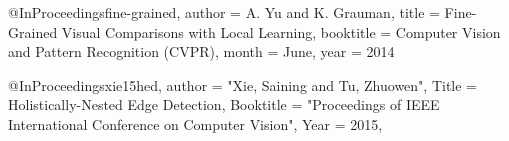 @InProceedings{fine-grained,
  author = {A. Yu and K. Grauman},
  title = {{F}ine-{G}rained {V}isual {C}omparisons with {L}ocal {L}earning},
  booktitle = {Computer Vision and Pattern Recognition (CVPR)},
  month = {June},
  year = {2014}
}

@InProceedings{xie15hed,
  author = {"Xie, Saining and Tu, Zhuowen"},
  Title = {Holistically-Nested Edge Detection},
  Booktitle = "Proceedings of IEEE International Conference on Computer Vision",
  Year  = {2015},
}
